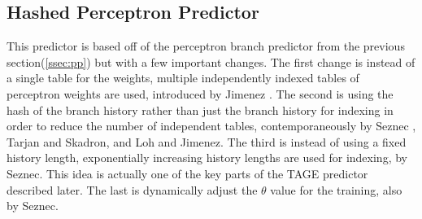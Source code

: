 \documentclass[conference]{IEEEtran}
\begin{document}
\subsection{Hashed Perceptron Predictor} \label{ssec::hp}
This predictor is based off of the perceptron branch predictor from the previous section(\ref{ssec:pp}) but with a few important changes. The first change is instead of a single table for the weights, multiple independently indexed tables of perceptron weights are used, introduced by Jimenez \cite{jimenez2003}.  The second is using the hash of the branch history rather than just the branch history for indexing in order to reduce the number of independent tables, contemporaneously by Seznec \cite{seznec2004}, Tarjan and Skadron\cite{skadron2004}, and Loh and Jimenez\cite{loh2005reducing}.  The third is instead of using a fixed history length, exponentially increasing history lengths are used for indexing, by Seznec\cite{seznec2004gehl}\cite{seznec2005analysis}. This idea is actually one of the key parts of the TAGE predictor described later. The last is dynamically adjust the $\theta$ value for the training, also by Seznec\cite{seznec2004gehl}\cite{seznec2005analysis}.





\vspace{12pt}
\end{document}
